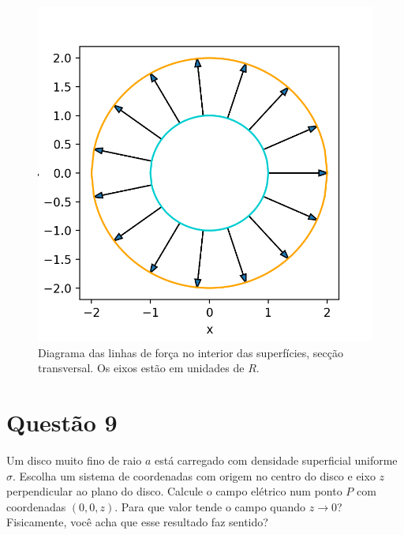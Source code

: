 \documentclass[11pt]{article}
\begin{document}
\begin{figure}[h!]
  \centering
  \includegraphics{imagens/ex-8.png}
  \caption{Diagrama das linhas de força no interior das superfícies, secção transversal.
  Os eixos estão em unidades de $R$.}
  \label{fig:ex-8-forca}
\end{figure}
\section{Questão 9}
\label{sec:org71e8cd3}
Um disco muito fino de raio \(a\) está carregado com densidade superficial
uniforme \(\sigma\). Escolha um sistema de coordenadas com origem no centro do
disco e eixo \(z\) perpendicular ao plano do disco. Calcule o campo
elétrico num ponto \(P\) com coordenadas \((0,0,z)\). Para que valor tende o
campo quando \(z\rightarrow0\)? Fisicamente, você acha que esse resultado faz
sentido?
\end{document}
